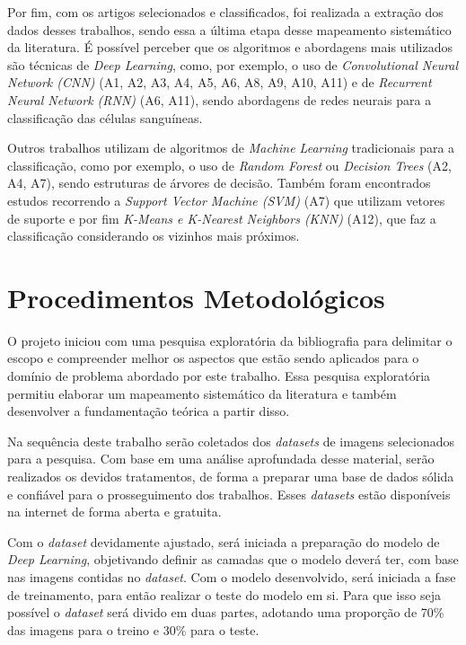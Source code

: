 Por fim, com os artigos selecionados e classificados, foi realizada a extração dos dados desses trabalhos, sendo essa a última etapa desse mapeamento sistemático da literatura. É possível perceber que os algoritmos e abordagens mais utilizados são técnicas de \emph{Deep Learning}, como, por exemplo, o uso de \emph{Convolutional Neural Network (CNN)} (A1, A2, A3, A4, A5, A6, A8, A9, A10, A11) e de \emph{Recurrent Neural Network (RNN)} (A6, A11), sendo abordagens de redes neurais para a classificação das células sanguíneas.

Outros trabalhos utilizam de algoritmos de \emph{Machine Learning} tradicionais para a classificação, como por exemplo, o uso de \emph{Random Forest} ou \emph{Decision Trees}  (A2, A4, A7), sendo estruturas de árvores de decisão. Também foram encontrados estudos recorrendo a \emph{Support Vector Machine (SVM)} (A7) que utilizam vetores de suporte e por fim \emph{K-Means e K-Nearest Neighbors (KNN)} (A12), que faz a classificação considerando os vizinhos mais próximos.

\chapter{Procedimentos Metodológicos}
\label{chap:metodologia}


O projeto iniciou com uma pesquisa exploratória da bibliografia para delimitar o escopo e compreender melhor os aspectos que estão sendo aplicados para o domínio de problema abordado por este trabalho. Essa pesquisa exploratória permitiu elaborar um mapeamento sistemático da literatura e também desenvolver a fundamentação teórica a partir disso.

Na sequência deste trabalho serão coletados dos \emph{datasets} de imagens selecionados para a pesquisa. Com base em uma análise aprofundada desse material, serão realizados os devidos tratamentos, de forma a preparar uma base de dados sólida e confiável para o prosseguimento dos trabalhos. Esses \emph{datasets} estão disponíveis na internet de forma aberta e gratuita.

Com o \emph{dataset} devidamente ajustado, será iniciada a preparação do modelo de \emph{Deep Learning}, objetivando definir as camadas que o modelo deverá ter, com base nas imagens contidas no \emph{dataset}. Com o modelo desenvolvido, será iniciada a fase de treinamento, para então realizar o teste do modelo em si. Para que isso seja possível o \emph{dataset} será divido em duas partes, adotando uma proporção de 70\% das imagens para o treino e 30\% para o teste.

